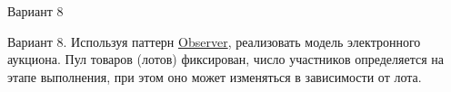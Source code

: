 \begin{center} Вариант 8 \end{center}  Вариант 8. Используя паттерн \mbox{\hyperlink{class_observer}{Observer}}, реализовать модель электронного аукциона. Пул товаров (лотов) фиксирован, число участников определяется на этапе выполнения, при этом оно может изменяться в зависимости от лота. 